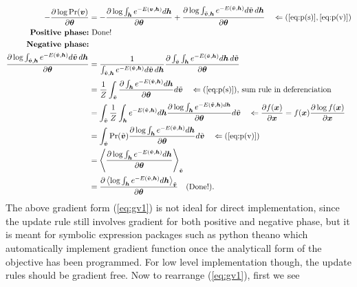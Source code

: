 \documentclass[11pt]{article}
\newcommand{\mean}[2]{\left\langle{#1}\right\rangle_{#2}}
\newcommand{\vh}{\boldsymbol{h}}
\newcommand{\vv}{\boldsymbol{v}}
\newcommand{\vx}{\boldsymbol{x}}
\newcommand{\vvt}{\tilde{\vv}}
\newcommand{\pEC}{\boldsymbol{\theta}}
\newcommand{\PDV}[2]{\frac{\partial #1}{\partial #2}}
\begin{document}
\begin{align*}
  -\PDV{\log{\Pr(\vv)}}{\pEC}
  & = -\PDV{\log{\int_{\vh}{e^{-E(\vv, \vh)}d\vh}}}{\pEC} + \PDV{\log{\int_{\vvt, \vh} e^{-E(\vvt, \vh)} d\vvt\,d\vh }}{\pEC} \quad \Leftarrow (\ref{eq:p(s)}, \ref{eq:p(v)}) \\
  \textrm{\textbf{Positive phase:}} & \textrm{ Done!} \\
  \textrm{\textbf{Negative phase:}} \\
  \PDV{\log{\int_{\vvt, \vh} e^{-E(\vvt, \vh)} d\vvt\,d\vh }}{\pEC}
  & = \frac{1}{\int_{\vvt, \vh} e^{-E(\vvt, \vh)} d\vvt\,d\vh} \PDV{\int_{\vvt}\int_{\vh} e^{-E(\vvt, \vh)} d\vh\,d\vvt}{\pEC} \\
  & = \frac{1}{Z} \int_{\vvt} \PDV{ \int_{\vh}{e^{-E(\vvt, \vh)}}d\vh }{ \pEC } d\vvt \quad \Leftarrow (\ref{eq:p(s)}),\,\textrm{sum rule in deferenciation} \\
  & = \int_{\vvt}  \frac{1}{Z}\int_{\vh} e^{-E(\vvt, \vh)} d\vh \PDV{\log{\int_{\vh} e^{-E(\vvt, \vh) d\vh}}}{\pEC}  d\vvt \quad \Leftarrow \PDV{f(\vx)}{\vx}=f(\vx)\PDV{\log{f(\vx)}}{\vx} \\
  & = \int_{\vvt}{\Pr(\vvt) \PDV{\log{\int_{\vh}{e^{-E(\vvt, \vh)}d\vh}}}{\pEC}}d\vvt \quad \Leftarrow (\ref{eq:p(v)}) \\
  & = \mean{\PDV{\log{\int_{\vh}{e^{-E(\vvt, \vh)}d\vh}}}{\pEC}}{\vvt} \\
  & = \PDV{\mean{\log{\int_{\vh}{e^{-E(\vvt, \vh)}d\vh}}}{\vvt}}{\pEC} \quad (\textrm{Done!}).
\end{align*}
The above gradient form (\ref{eq:gv1}) is not ideal for direct implementation, since the update rule still involves gradient for both positive and negative phase, but it is meant for symbolic expression packages such as python theano which automatically implement gradient function once the analyticall form of the objective has been programmed.
For low level implementation though, the update rules should be gradient free. Now to rearrange (\ref{eq:gv1}), first we see
\end{document}
